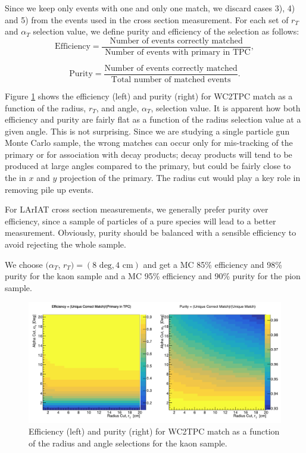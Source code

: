 Since we keep only events with one and only one match, we discard cases 3), 4) and 5) from the events used in the cross section measurement. For each set of $r_{T}$ and $\alpha_{T}$ selection value, we define purity and efficiency of the selection as follows:
\begin{equation}
\text{Efficiency} = \frac{\text{Number of events correctly matched}}{\text{ Number of events with primary in TPC}},
\end{equation}

\begin{equation}
\text{Purity} = \frac{\text{Number of events correctly matched}}{\text{Total number of matched events}}.
\end{equation}

Figure \ref{fig:EffPurityK} shows the efficiency (left) and purity (right) for WC2TPC match as a function of the radius, $r_{T}$, and angle, $\alpha_{T}$, selection value. It is apparent how both efficiency and purity are fairly flat as a function of the radius selection value at a given angle. This is not surprising. Since we are studying a single particle gun Monte Carlo sample, the wrong matches can occur only for mis-tracking of the primary or for association with decay products;  decay products will tend to be produced at large angles compared to the primary, but could be fairly close to the in $x$ and $y$ projection of the primary. The radius cut would play a key role in removing pile up events. 

For LArIAT cross section measurements, we generally prefer purity over efficiency, since a sample of particles of a pure species will lead to a better measurement. Obviously, purity should be balanced with a sensible efficiency to avoid rejecting the whole sample. 

We choose $(\alpha_{T}$, $r_{T}) = (8 \text{ deg}, 4 \text{ cm} )$ and get a MC 85\% efficiency and 98\% purity for the kaon sample and a MC 95\% efficiency and 90\% purity for the pion sample.


\begin{figure}[hpbt]
\centering
\includegraphics[width=15cm]{Chapter-5/Images/KEffPurity.png}
\caption{Efficiency (left) and purity (right) for WC2TPC match as a function of the radius and angle selections for the kaon sample.}
\label{fig:EffPurityK}
\end{figure}




